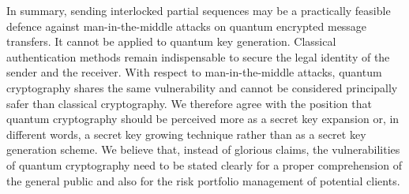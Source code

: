 \documentclass{ws-ijqi}
\begin{document}
In summary,  sending interlocked partial sequences may be a practically feasible
defence against man-in-the-middle attacks on quantum encrypted message transfers.
It cannot be applied to quantum key generation.
Classical authentication methods remain indispensable to secure the legal identity of
the sender and the receiver.
With respect to man-in-the-middle attacks,
quantum cryptography shares the same vulnerability and cannot be considered principally safer
than classical cryptography.
We therefore agree with the position that quantum cryptography should be perceived more
as a secret key expansion \cite{benn-84,benn-82} or, in different words, a
secret key growing technique \cite{peev-04} rather than as a secret key generation scheme.
We believe that, instead of glorious claims, the vulnerabilities of quantum cryptography
need to be stated clearly for a proper comprehension
of the general public and also for the risk portfolio management of potential clients.


%
%
%
%
%
\end{document}
